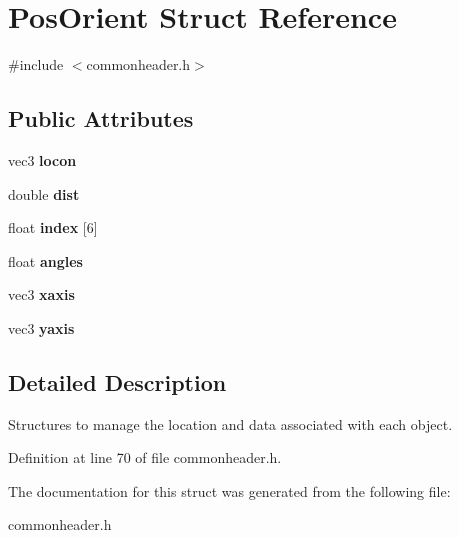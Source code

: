 \hypertarget{structPosOrient}{}\section{Pos\+Orient Struct Reference}
\label{structPosOrient}


{\ttfamily \#include $<$commonheader.\+h$>$}

\subsection*{Public Attributes}
\begin{DoxyCompactItemize}
\item 
\mbox{\label{structPosOrient_ada336cf840d1815329950b7382b8bb26}} 
vec3 {\bfseries locon}
\item 
\mbox{\label{structPosOrient_a83982e054e182fe9f3788efe13b60e94}} 
double {\bfseries dist}
\item 
\mbox{\label{structPosOrient_a416da340d93a46c0f636baccf6983611}} 
float {\bfseries index} \mbox{[}6\mbox{]}
\item 
\mbox{\label{structPosOrient_a6f5f29c42db9bf7ab943bf0a251d239c}} 
float {\bfseries angles}
\item 
\mbox{\label{structPosOrient_ae10c9eb375892ee86589bd0409037356}} 
vec3 {\bfseries xaxis}
\item 
\mbox{\label{structPosOrient_aa2ff77e127820352715dfd9969d9e0c2}} 
vec3 {\bfseries yaxis}
\end{DoxyCompactItemize}


\subsection{Detailed Description}
Structures to manage the location and data associated with each object. 

Definition at line 70 of file commonheader.\+h.



The documentation for this struct was generated from the following file\+:\begin{DoxyCompactItemize}
\item 
commonheader.\+h\end{DoxyCompactItemize}
